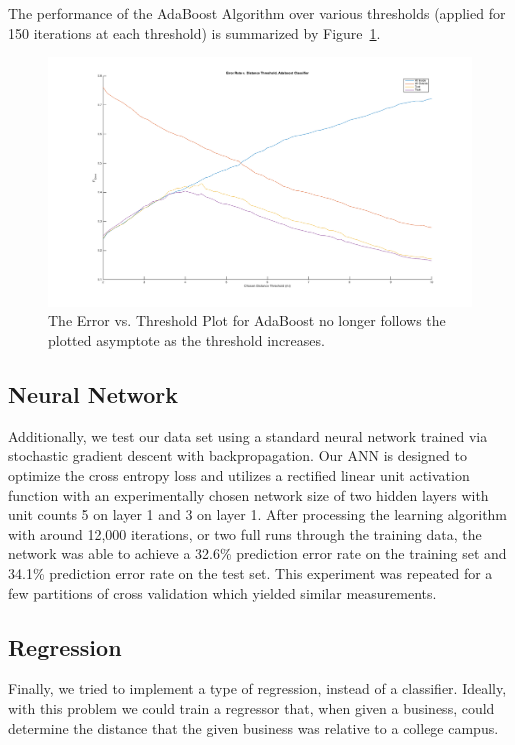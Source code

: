 \documentclass[10pt,twocolumn,letterpaper]{article}
\begin{document}
The performance of the AdaBoost Algorithm over various thresholds (applied for
150 iterations at each threshold) is summarized by
Figure~\ref{fig:Adaboost_Sweep}.

\begin{figure}[H]
  \includegraphics[width=0.9\linewidth]{adaboost_sweep_stumps_0_1_150iter_filtered}
  \caption{The Error vs. Threshold Plot for AdaBoost no longer follows the plotted asymptote as the threshold increases.}
\label{fig:Adaboost_Sweep}
\end{figure}

\subsection{Neural Network}

Additionally, we test our data set using a standard neural network trained via
stochastic gradient descent with backpropagation. Our ANN is designed to
optimize the cross entropy loss and utilizes a rectified linear unit activation
function with an experimentally chosen network size of two hidden layers with
unit counts 5 on layer 1 and 3 on layer 1. After processing the learning
algorithm with around 12,000 iterations, or two full runs through the training
data, the network was able to achieve a 32.6\% prediction error rate on the
training set and 34.1\% prediction error rate on the test set. This experiment
was repeated for a few partitions of cross validation which yielded similar
measurements.

\subsection{Regression}

Finally, we tried to implement a type of regression, instead of a classifier. Ideally, with this problem we could train a regressor that, when given a business, could determine the distance that the given business was relative to a college campus.
\end{document}
